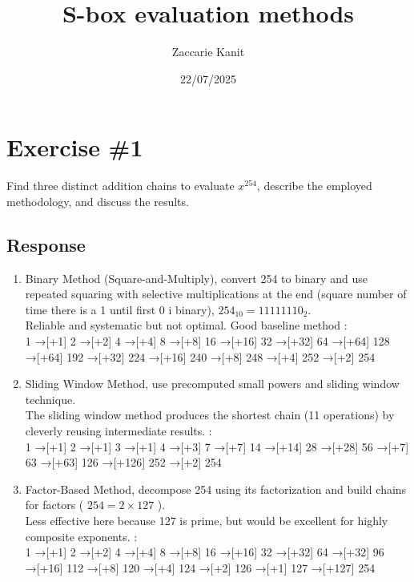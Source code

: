 \documentclass{article}
\author{Zaccarie Kanit}
\date{22/07/2025}
\title{S-box evaluation methods}
\begin{document}
\maketitle

\section*{Exercise \#1}
Find three distinct addition chains to evaluate $x^{254}$, describe the employed methodology, 
and discuss the results.

\subsection*{Response}
\begin{enumerate}
  \item Binary Method (Square-and-Multiply), convert 254 to binary and use repeated squaring
  with selective multiplications at the end (square number of time there is a 1 until first 0 i binary),
  $254_{10} = 11111110_2$. \\ 
  Reliable and systematic but not optimal. Good baseline method : \\
  1 →[+1] 2 →[+2] 4 →[+4] 8 →[+8] 16 →[+16] 32 →[+32] 64 →[+64] 128 →[+64] 192 →[+32] 224 →[+16] 240 →[+8] 248 →[+4] 252 →[+2] 254
  \item Sliding Window Method, use precomputed small powers and sliding window technique. \\
  The sliding window method produces the shortest chain (11 operations) by cleverly reusing intermediate results. : \\
  1 →[+1] 2 →[+1] 3 →[+1] 4 →[+3] 7 →[+7] 14 →[+14] 28 →[+28] 56 →[+7] 63 →[+63] 126 →[+126] 252 →[+2] 254
  \item Factor-Based Method, decompose 254 using its factorization and build chains for factors
  ( $254 = 2 \times 127$ ). \\
  Less effective here because 127 is prime, but would be excellent for highly composite exponents. : \\
  1 →[+1] 2 →[+2] 4 →[+4] 8 →[+8] 16 →[+16] 32 →[+32] 64 →[+32] 96 →[+16] 112 →[+8] 120 →[+4] 124 →[+2] 126 →[+1] 127 →[+127] 254
\end{enumerate}
\end{document}
